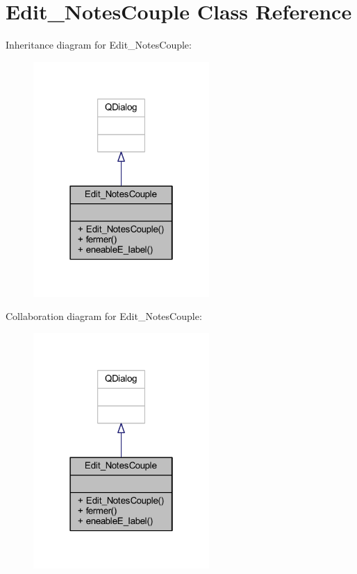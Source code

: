 \hypertarget{class_edit___notes_couple}{}\section{Edit\+\_\+\+Notes\+Couple Class Reference}
\label{class_edit___notes_couple}


Inheritance diagram for Edit\+\_\+\+Notes\+Couple\+:
\nopagebreak
\begin{figure}[H]
\begin{center}
\leavevmode
\includegraphics[width=190pt]{class_edit___notes_couple__inherit__graph}
\end{center}
\end{figure}


Collaboration diagram for Edit\+\_\+\+Notes\+Couple\+:
\nopagebreak
\begin{figure}[H]
\begin{center}
\leavevmode
\includegraphics[width=190pt]{class_edit___notes_couple__coll__graph}
\end{center}
\end{figure}
